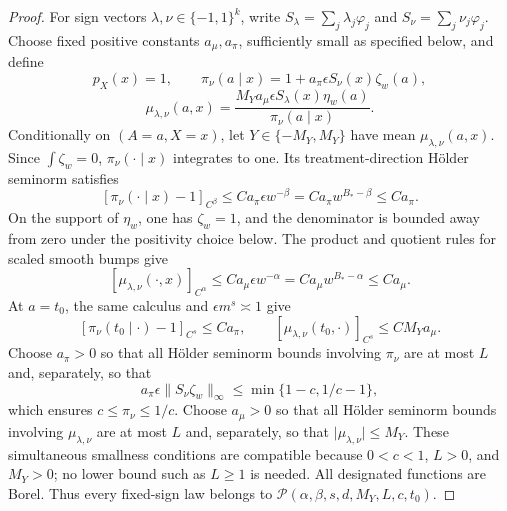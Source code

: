 \documentclass{article}
\begin{document}
\begin{proof}
For sign vectors \(\lambda,\nu\in\{-1,1\}^k\), write \(S_\lambda=\sum_j\lambda_j\varphi_j\) and \(S_\nu=\sum_j\nu_j\varphi_j\). Choose fixed positive constants \(a_\mu,a_\pi\), sufficiently small as specified below, and define
\[
p_X(x)=1,\qquad \pi_\nu(a\mid x)=1+a_\pi\epsilon S_\nu(x)\zeta_w(a),
\]
\[
\mu_{\lambda,\nu}(a,x)=\frac{M_Ya_\mu\epsilon S_\lambda(x)\eta_w(a)}{\pi_\nu(a\mid x)}.
\]
Conditionally on \((A=a,X=x)\), let \(Y\in\{-M_Y,M_Y\}\) have mean \(\mu_{\lambda,\nu}(a,x)\). Since \(\int\zeta_w=0\), \(\pi_\nu(\cdot\mid x)\) integrates to one. Its treatment-direction H\"older seminorm satisfies
\[
[\pi_\nu(\cdot\mid x)-1]_{C^\beta}\le Ca_\pi\epsilon w^{-\beta}=Ca_\pi w^{B_*-\beta}\le Ca_\pi.
\]
On the support of \(\eta_w\), one has \(\zeta_w=1\), and the denominator is bounded away from zero under the positivity choice below. The product and quotient rules for scaled smooth bumps give
\[
[\mu_{\lambda,\nu}(\cdot,x)]_{C^\alpha}\le Ca_\mu\epsilon w^{-\alpha}=Ca_\mu w^{B_*-\alpha}\le Ca_\mu.
\]
At \(a=t_0\), the same calculus and \(\epsilon m^s\asymp1\) give
\[
[\pi_\nu(t_0\mid\cdot)-1]_{C^s}\le Ca_\pi,\qquad [\mu_{\lambda,\nu}(t_0,\cdot)]_{C^s}\le CM_Ya_\mu.
\]
Choose \(a_\pi>0\) so that all H\"older seminorm bounds involving \(\pi_\nu\) are at most \(L\) and, separately, so that
\[
a_\pi\epsilon\lVert S_\nu\zeta_w\rVert_\infty\le\min\{1-c,1/c-1\},
\]
which ensures \(c\le\pi_\nu\le1/c\). Choose \(a_\mu>0\) so that all H\"older seminorm bounds involving \(\mu_{\lambda,\nu}\) are at most \(L\) and, separately, so that \(\lvert\mu_{\lambda,\nu}\rvert\le M_Y\). These simultaneous smallness conditions are compatible because \(0<c<1\), \(L>0\), and \(M_Y>0\); no lower bound such as \(L\ge1\) is needed. All designated functions are Borel. Thus every fixed-sign law belongs to \(\mathcal P(\alpha,\beta,s,d,M_Y,L,c,t_0)\).


\end{proof}
\end{document}
